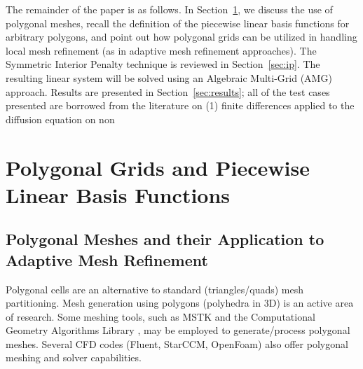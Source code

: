 \documentclass[preprint,10pt]{elsarticle}
\newcommand{\sct}[1]{Section~\ref{#1}}                   %
\begin{document}
The remainder of the paper is as follows. In \sct{sec:poly}, we discuss
the use of polygonal meshes, recall the definition of the piecewise linear
basis functions for arbitrary polygons, and point out how polygonal grids
can be utilized in handling local mesh refinement (as in adaptive mesh refinement 
approaches). The Symmetric Interior Penalty technique is reviewed in \sct{sec:ip}.
The resulting linear system will be solved using an Algebraic Multi-Grid (AMG) approach.
Results are presented in \sct{sec:results}; all of the test cases presented
are borrowed from the literature on (1) finite differences applied to the
diffusion equation on non 

\section{Polygonal Grids and Piecewise Linear Basis Functions} \label{sec:poly}
\subsection{Polygonal Meshes and their Application to Adaptive Mesh Refinement}

Polygonal cells are an alternative to standard (triangles/quads) mesh partitioning.
Mesh generation using polygons (polyhedra in 3D) is an active area of research.
Some meshing tools, such as MSTK \cite{mstk} and the Computational Geometry Algorithms 
Library \cite{cgal}, may be employed to generate/process polygonal meshes.  
Several CFD codes (Fluent, StarCCM, OpenFoam) also offer polygonal meshing and solver capabilities. 
\end{document}
